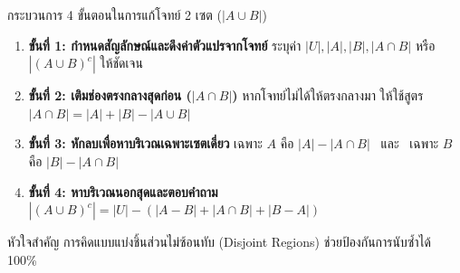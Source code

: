 \begin{frame}{กระบวนการ 4 ขั้นตอนในการแก้โจทย์ 2 เซต ($|A \cup B|$)}
  \begin{enumerate}
    \item \textbf{ขั้นที่ 1: กำหนดสัญลักษณ์และดึงค่าตัวแปรจากโจทย์}
          ระบุค่า $|U|, |A|, |B|, |A \cap B|$ หรือ $|(A \cup B)^c|$ ให้ชัดเจน
    \item \textbf{ขั้นที่ 2: เติมช่องตรงกลางสุดก่อน ($|A \cap B|$)}
          หากโจทย์ไม่ได้ให้ตรงกลางมา ให้ใช้สูตร $|A \cap B| = |A| + |B| - |A \cup B|$
    \item \textbf{ขั้นที่ 3: หักลบเพื่อหาบริเวณเฉพาะเซตเดี่ยว}
          เฉพาะ $A$ คือ $|A| - |A \cap B|$ \ และ \ เฉพาะ $B$ คือ $|B| - |A \cap B|$
    \item \textbf{ขั้นที่ 4: หาบริเวณนอกสุดและตอบคำถาม}
          $|(A \cup B)^c| = |U| - (|A - B| + |A \cap B| + |B - A|)$
  \end{enumerate}
  \vspace{0.2em}
  \begin{exampleblock}{หัวใจสำคัญ}
    การคิดแบบแบ่งชิ้นส่วนไม่ซ้อนทับ (Disjoint Regions) ช่วยป้องกันการนับซ้ำได้ 100\%
  \end{exampleblock}
\end{frame}

